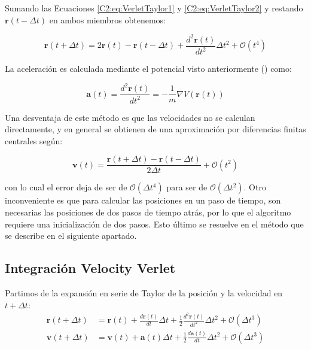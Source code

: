 Sumando las Ecuaciones \ref{C2:eq:VerletTaylor1} y \ref{C2:eq:VerletTaylor2} y restando $\mathbf{r}(t-\Delta{}t)$ en ambos miembros obtenemos:

\begin{equation}
\mathbf{r}(t+\Delta{}t) = 2\mathbf{r}(t) - \mathbf{r}(t-\Delta{}t) + \frac{d^{2}\mathbf{r}(t)}{dt^{2}} \Delta{}t^{2} + \mathcal{O}(t^{4})
\label{C2:eq:VerletPos}
\end{equation}

La aceleración es calculada mediante el potencial visto anteriormente () como:

\begin{equation}
\mathbf{a}(t) = \frac{d^{2}\mathbf{r}(t)}{dt^{2}} = -\frac{1}{m}\nabla{}V(\mathbf{r}(t))
\end{equation}

Una desventaja de este método es que las velocidades no se calculan directamente, y en general se obtienen de una aproximación por diferencias finitas centrales según:

\begin{equation}
\mathbf{v}(t) = \frac{\mathbf{r}(t+\Delta{}t) - \mathbf{r}(t-\Delta{}t)}{2\Delta{}t} + \mathcal{O}(t^{2})
\end{equation}

con lo cual el error deja de ser de $\mathcal{O}(\Delta{}t^{4})$ para ser de $\mathcal{O}(\Delta{}t^{2})$. Otro inconveniente es que para calcular las posiciones en un paso de tiempo, son necesarias las posiciones de dos pasos de tiempo atrás, por lo que el algoritmo requiere una inicialización de dos pasos. Esto último se resuelve en el método que se describe en el siguiente apartado.

\subsection{Integración Velocity Verlet}
\label{S2_4_2}

Partimos de la expansión en serie de Taylor de la posición y la velocidad en $t+\Delta{}t$:
\vspace{-0.3pt}
\begin{align}
\mathbf{r}(t+\Delta{}t) & = \mathbf{r}(t)+\frac{d\mathbf{r}(t)}{dt} \Delta{}t + \frac{1}{2} \frac{d^{2}\mathbf{r}(t)}{dt^{2}} \Delta{}t^{2} + \mathcal{O}(\Delta{}t^{3})
\label{C2:eq:VelVerletTaylor1} \\
\mathbf{v}(t+\Delta{}t) & = \mathbf{v}(t)+\mathbf{a}(t)\Delta{}t + \frac{1}{2}\frac{d\mathbf{a}(t)}{dt} \Delta{}t^{2} + \mathcal{O}(\Delta{}t^{3})
\label{C2:eq:VelVerletTaylor2}
\end{align}

